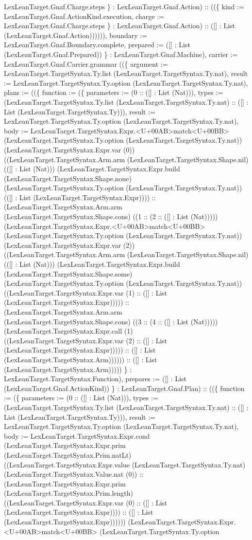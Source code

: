 \documentclass[11pt]{article}
\begin{document}
LexLeanTarget.Gnaf.Charge.steps \} : LexLeanTarget.Gnaf.Action) :: ((\{ kind := LexLeanTarget.Gnaf.ActionKind.execution, charge := LexLeanTarget.Gnaf.Charge.steps \} : LexLeanTarget.Gnaf.Action) :: ([] : List (LexLeanTarget.Gnaf.Action)))))), boundary := LexLeanTarget.Gnaf.Boundary.complete, prepared := ([] : List (LexLeanTarget.Gnaf.Prepared)) \} : LexLeanTarget.Gnaf.Machine), carrier := LexLeanTarget.Gnaf.Carrier.grammar ((\{ argument := LexLeanTarget.TargetSyntax.Ty.list (LexLeanTarget.TargetSyntax.Ty.nat), result := LexLeanTarget.TargetSyntax.Ty.option (LexLeanTarget.TargetSyntax.Ty.nat), plans := ((\{ function := (\{ parameters := (0 :: ([] : List (Nat))), types := (LexLeanTarget.TargetSyntax.Ty.list (LexLeanTarget.TargetSyntax.Ty.nat) :: ([] : List (LexLeanTarget.TargetSyntax.Ty))), result := LexLeanTarget.TargetSyntax.Ty.option (LexLeanTarget.TargetSyntax.Ty.nat), body := LexLeanTarget.TargetSyntax.Expr.<U+00AB>match<U+00BB> (LexLeanTarget.TargetSyntax.Ty.option (LexLeanTarget.TargetSyntax.Ty.nat)) (LexLeanTarget.TargetSyntax.Expr.var (0)) ((LexLeanTarget.TargetSyntax.Arm.arm (LexLeanTarget.TargetSyntax.Shape.nil) (([] : List (Nat))) (LexLeanTarget.TargetSyntax.Expr.build (LexLeanTarget.TargetSyntax.Shape.none) (LexLeanTarget.TargetSyntax.Ty.option (LexLeanTarget.TargetSyntax.Ty.nat)) (([] : List (LexLeanTarget.TargetSyntax.Expr)))) :: (LexLeanTarget.TargetSyntax.Arm.arm (LexLeanTarget.TargetSyntax.Shape.cons) ((1 :: (2 :: ([] : List (Nat))))) (LexLeanTarget.TargetSyntax.Expr.<U+00AB>match<U+00BB> (LexLeanTarget.TargetSyntax.Ty.option (LexLeanTarget.TargetSyntax.Ty.nat)) (LexLeanTarget.TargetSyntax.Expr.var (2)) ((LexLeanTarget.TargetSyntax.Arm.arm (LexLeanTarget.TargetSyntax.Shape.nil) (([] : List (Nat))) (LexLeanTarget.TargetSyntax.Expr.build (LexLeanTarget.TargetSyntax.Shape.some) (LexLeanTarget.TargetSyntax.Ty.option (LexLeanTarget.TargetSyntax.Ty.nat)) ((LexLeanTarget.TargetSyntax.Expr.var (1) :: ([] : List (LexLeanTarget.TargetSyntax.Expr))))) :: (LexLeanTarget.TargetSyntax.Arm.arm (LexLeanTarget.TargetSyntax.Shape.cons) ((3 :: (4 :: ([] : List (Nat))))) (LexLeanTarget.TargetSyntax.Expr.call (1) ((LexLeanTarget.TargetSyntax.Expr.var (2) :: ([] : List (LexLeanTarget.TargetSyntax.Expr))))) :: ([] : List (LexLeanTarget.TargetSyntax.Arm)))))) :: ([] : List (LexLeanTarget.TargetSyntax.Arm))))) \} : LexLeanTarget.TargetSyntax.Function), prepares := ([] : List (LexLeanTarget.Gnaf.ActionKind)) \} : LexLeanTarget.Gnaf.Plan) :: ((\{ function := (\{ parameters := (0 :: ([] : List (Nat))), types := (LexLeanTarget.TargetSyntax.Ty.list (LexLeanTarget.TargetSyntax.Ty.nat) :: ([] : List (LexLeanTarget.TargetSyntax.Ty))), result := LexLeanTarget.TargetSyntax.Ty.option (LexLeanTarget.TargetSyntax.Ty.nat), body := LexLeanTarget.TargetSyntax.Expr.cond (LexLeanTarget.TargetSyntax.Expr.prim (LexLeanTarget.TargetSyntax.Prim.natLt) ((LexLeanTarget.TargetSyntax.Expr.value (LexLeanTarget.TargetSyntax.Ty.nat) (LexLeanTarget.TargetSyntax.Value.nat (0)) :: (LexLeanTarget.TargetSyntax.Expr.prim (LexLeanTarget.TargetSyntax.Prim.length) ((LexLeanTarget.TargetSyntax.Expr.var (0) :: ([] : List (LexLeanTarget.TargetSyntax.Expr)))) :: ([] : List (LexLeanTarget.TargetSyntax.Expr)))))) (LexLeanTarget.TargetSyntax.Expr.<U+00AB>match<U+00BB> (LexLeanTarget.TargetSyntax.Ty.option 
\end{document}

